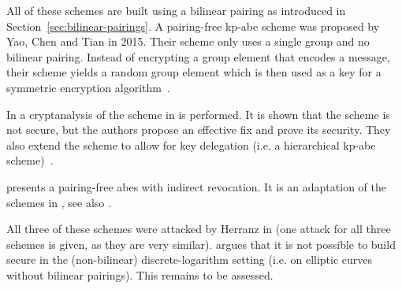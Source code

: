 All of these schemes are built using a bilinear pairing as introduced in Section~\ref{sec:bilinear-pairings}.
A pairing-free \acrshort{kp-abe} scheme was proposed by Yao, Chen and Tian \cite{yao_lightweight_2015} in 2015.
Their scheme only uses a single group and no bilinear pairing.
Instead of encrypting a group element that encodes a message, their scheme yields a random group element which is then used as a key for a symmetric encryption algorithm~\cite{yao_lightweight_2015}.

In \cite{tan_enhancement_2019} a cryptanalysis of the scheme in \cite{yao_lightweight_2015} is performed.
It is shown that the scheme is not secure, but the authors propose an effective fix and prove its security.
They also extend the scheme to allow for key delegation (i.e. a hierarchical \acrshort{kp-abe} scheme)~\cite{tan_enhancement_2019}.

\cite{sowjanya_efficient_2020} presents a pairing-free \acrshort{abes} with indirect revocation.
It is an adaptation of the schemes in \cite{yao_lightweight_2015,tan_enhancement_2019}, see also \cite{herranz_attacking_2020}.

All three of these schemes were attacked by Herranz in \cite{herranz_attacking_2020} (one attack for all three schemes is given, as they are very similar).
\cite{herranz_attacking_2020} argues that it is not possible to build secure  in the (non-bilinear) discrete-logarithm setting (i.e. on elliptic curves without bilinear pairings).
This remains to be assessed.

